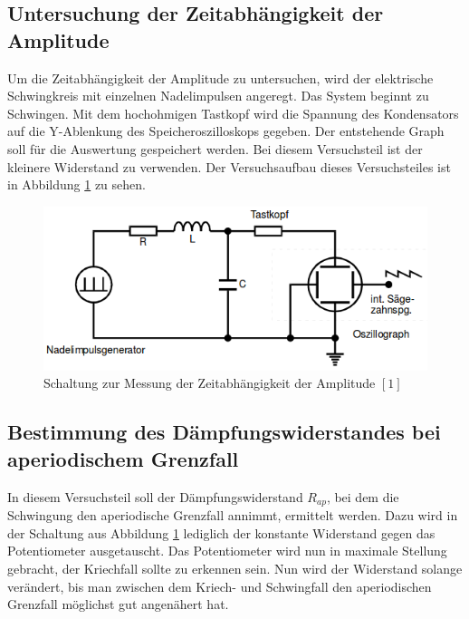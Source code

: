 \documentclass[11pt,ngerman,a4paper]{article}
\begin{document}
\subsection{Untersuchung der Zeitabhängigkeit der Amplitude}
Um die Zeitabhängigkeit der Amplitude zu untersuchen, wird der elektrische Schwingkreis mit einzelnen Nadelimpulsen angeregt. Das System beginnt zu Schwingen. Mit dem hochohmigen Tastkopf wird die Spannung des Kondensators auf die Y-Ablenkung des Speicheroszilloskops gegeben. Der entstehende Graph soll für die Auswertung gespeichert werden. Bei diesem Versuchsteil ist der kleinere Widerstand zu verwenden. Der Versuchsaufbau dieses Versuchsteiles ist in Abbildung \ref{S1} zu sehen.
\begin{figure}[h]
\centering
\includegraphics[scale=0.7]{Aufbau1.png}
\caption{Schaltung zur Messung der Zeitabhängigkeit der Amplitude $[1]$}
\label{S1}
\end{figure}
\subsection{Bestimmung des Dämpfungswiderstandes bei aperiodischem Grenzfall}
In diesem Versuchsteil soll der Dämpfungswiderstand $R_{ap}$, bei dem die Schwingung den aperiodische Grenzfall annimmt, ermittelt werden. Dazu wird in der Schaltung aus Abbildung \ref{S1} lediglich der konstante Widerstand gegen das Potentiometer ausgetauscht. Das Potentiometer wird nun in maximale Stellung gebracht, der Kriechfall sollte zu erkennen sein. Nun wird der Widerstand solange verändert, bis man zwischen dem Kriech- und Schwingfall den aperiodischen Grenzfall möglichst gut angenähert hat.
\end{document}
